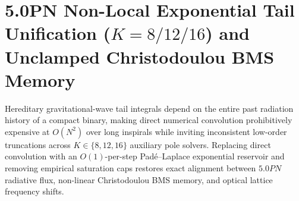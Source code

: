 \documentclass[11pt,a4paper,reqno]{article}
\def\mathrm#1{#1}%
\def\mathcal#1{#1}%
\theoremstyle{plain}
\theoremstyle{definition}
\theoremstyle{remark}
\numberwithin{equation}{section}
\numberwithin{table}{section}
\begin{document}
\section{\texorpdfstring{5.0PN Non-Local Exponential Tail Unification ($K=8/12/16$) and Unclamped Christodoulou BMS Memory}{5.0PN Non-Local Exponential Tail Unification (K=8/12/16) and Unclamped Christodoulou BMS Memory}}
\label{sec:5pn_pade_bms}

Hereditary gravitational-wave tail integrals depend on the entire past radiation history of a compact binary, making direct numerical convolution prohibitively expensive at $\mathcal{O}(N^2)$ over long inspirals while inviting inconsistent low-order truncations across $K \in \{8, 12, 16\}$ auxiliary pole solvers. Replacing direct convolution with an $\mathcal{O}(1)$-per-step Pad\'e--Laplace exponential reservoir and removing empirical saturation caps restores exact alignment between $5.0\mathrm{PN}$ radiative flux, non-linear Christodoulou BMS memory, and optical lattice frequency shifts.
\end{document}
